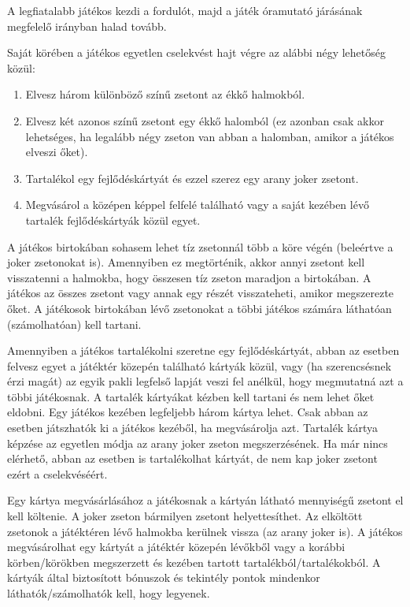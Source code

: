 A legfiatalabb játékos kezdi a fordulót, majd a játék óramutató járásának megfelelő irányban halad tovább.

Saját körében a játékos egyetlen cselekvést hajt végre az alábbi négy lehetőség közül:
\begin{enumerate}
\item Elvesz három különböző színű zsetont az ékkő halmokból.
\item Elvesz két azonos színű zsetont egy ékkő halomból (ez
azonban csak akkor lehetséges, ha legalább négy zseton van
abban a halomban, amikor a játékos elveszi őket).
\item Tartalékol egy fejlődéskártyát és ezzel szerez egy arany joker zsetont.
\item Megvásárol a középen képpel felfelé található vagy a
saját kezében lévő tartalék fejlődéskártyák közül egyet.
\end{enumerate}


A játékos birtokában sohasem lehet tíz zsetonnál több a köre végén (beleértve a joker zsetonokat is). Amennyiben ez megtörténik, akkor annyi zsetont kell visszatenni a halmokba, hogy összesen tíz zseton maradjon a birtokában. A játékos az összes zsetont vagy annak egy részét visszateheti, amikor megszerezte őket. A játékosok birtokában lévő zsetonokat a többi játékos számára láthatóan (számolhatóan) kell tartani. 


Amennyiben a játékos tartalékolni szeretne egy fejlődéskártyát, abban az esetben felvesz egyet a játéktér közepén található kártyák közül, vagy (ha szerencsésnek érzi magát) az egyik pakli legfelső lapját veszi fel anélkül, hogy megmutatná azt a többi játékosnak. A tartalék kártyákat kézben kell tartani és nem lehet őket eldobni. Egy játékos kezében legfeljebb három kártya lehet. Csak abban az esetben játszhatók ki a játékos kezéből, ha megvásárolja azt. Tartalék kártya képzése az egyetlen módja az arany joker zseton megszerzésének. Ha már nincs elérhető, abban az esetben is tartalékolhat kártyát, de nem kap joker zsetont ezért a cselekvéséért.


Egy kártya megvásárlásához a játékosnak a kártyán látható mennyiségű zsetont el kell költenie. A joker zseton bármilyen zsetont helyettesíthet. Az elköltött zsetonok a játéktéren lévő halmokba kerülnek vissza (az arany joker is). A játékos megvásárolhat egy kártyát a játéktér közepén lévőkből vagy a korábbi körben/körökben megszerzett és kezében tartott tartalékból/tartalékokból. A kártyák által biztosított bónuszok és tekintély pontok mindenkor láthatók/számolhatók kell, hogy legyenek.

